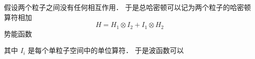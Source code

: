 
\begin{issues}
\issueDraft
\end{issues}


假设两个粒子之间没有任何相互作用． 于是总哈密顿可以记为两个粒子的哈密顿算符相加
\begin{equation}
H = H_1 \otimes I_2 + I_1 \otimes H_2
\end{equation}
势能函数

其中 $I_i$ 是每个单粒子空间中的单位算符． 于是波函数可以


